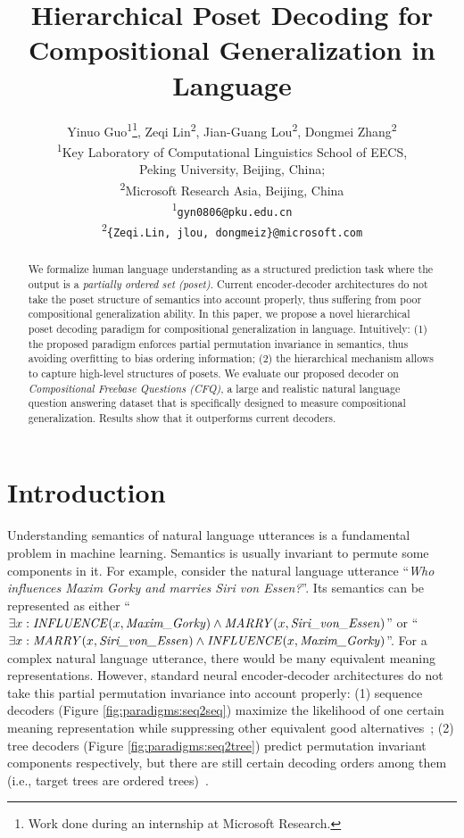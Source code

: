 \documentclass{article}
\title{Hierarchical Poset Decoding for Compositional Generalization in Language}
\author{Yinuo Guo\textsuperscript{\rm 1}\thanks{Work done during an internship at Microsoft Research.}, Zeqi Lin\textsuperscript{\rm 2}, Jian-Guang Lou\textsuperscript{\rm 2}, Dongmei Zhang\textsuperscript{\rm 2} \\
  \textsuperscript{\rm 1}Key Laboratory of Computational Linguistics
School of EECS, \\
Peking University, Beijing, China;\\
\textsuperscript{\rm 2}Microsoft Research Asia, Beijing, China \\
  \textsuperscript{\rm 1}\texttt{gyn0806@pku.edu.cn} \\
   \textsuperscript{\rm 2}\texttt{\{Zeqi.Lin, jlou, dongmeiz\}@microsoft.com} \\
}
\begin{document}
\maketitle

\begin{abstract}

We formalize human language understanding as a structured prediction task where the output is a \emph{partially ordered set (poset)}.
Current encoder-decoder architectures do not take the poset structure of semantics into account properly, thus suffering from poor compositional generalization ability.
In this paper, we propose a novel hierarchical poset decoding paradigm for compositional generalization in language.
Intuitively:
(1) the proposed paradigm enforces partial permutation invariance in semantics, thus avoiding overfitting to bias ordering information;
(2) the hierarchical mechanism allows to capture high-level structures of posets.
We evaluate our proposed decoder on \emph{Compositional Freebase Questions (CFQ)}, a large and realistic natural language question answering dataset that is specifically designed to measure compositional generalization.
Results show that it outperforms current decoders.

\end{abstract}

\section{Introduction}

Understanding semantics of natural language utterances
is a fundamental problem in machine learning.
Semantics is usually invariant to permute some components in it.
For example, consider the natural language utterance ``\emph{Who influences Maxim Gorky and marries Siri von Essen?}''.
Its semantics can be represented as either ``$\exists x: \text{\emph{INFLUENCE}}(x, \text{\emph{Maxim\_Gorky}})\wedge\text{\emph{MARRY}}(x, \text{\emph{Siri\_von\_Essen}})$'' or ``$\exists x: \text{\emph{MARRY}}(x, \text{\emph{Siri\_von\_Essen}})\wedge\text{\emph{INFLUENCE}}(x, \text{\emph{Maxim\_Gorky}})$''.
For a complex natural language utterance, there would be many equivalent meaning representations.
However, standard neural encoder-decoder architectures do not take this partial permutation invariance into account properly:
(1) sequence decoders (Figure \ref{fig:paradigms:seq2seq}) maximize the likelihood of one certain meaning representation while suppressing other equivalent good alternatives~\citep{sutskever2014sequence,bahdanau2014neural};
(2) tree decoders (Figure \ref{fig:paradigms:seq2tree}) predict permutation invariant components respectively, but there are still certain decoding orders among them (i.e., target trees are ordered trees)~\citep{dong-lapata-2016-language,polosukhin2018neural}.
\end{document}
